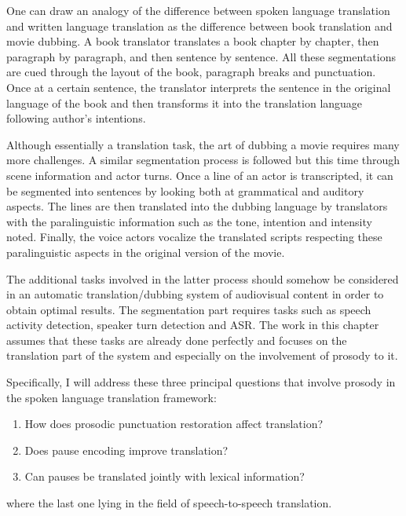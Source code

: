 One can draw an analogy of the difference between spoken language translation and written language translation as the difference between book translation and movie dubbing. A book translator translates a book chapter by chapter, then paragraph by paragraph, and then sentence by sentence. All these segmentations are cued through the layout of the book, paragraph breaks and punctuation. Once at a certain sentence, the translator interprets the sentence in the original language of the book and then transforms it into the translation language following author's intentions. 

Although essentially a translation task, the art of dubbing a movie requires many more challenges. A similar segmentation process is followed but this time through scene information and actor turns. Once a line of an actor is transcripted, it can be segmented into sentences by looking both at grammatical and auditory aspects. The lines are then translated into the dubbing language by translators with the paralinguistic information such as the tone, intention and intensity noted. Finally, the voice actors vocalize the translated scripts respecting these paralinguistic aspects in the original version of the movie. 

The additional tasks involved in the latter process should somehow be considered in an automatic translation/dubbing system of audiovisual content in order to obtain optimal results. The segmentation part requires tasks such as speech activity detection, speaker turn detection and ASR. The work in this chapter assumes that these tasks are already done perfectly and focuses on the translation part of the system and especially on the involvement of prosody to it. 

Specifically, I will address these three principal questions that involve prosody in the spoken language translation framework:

\begin{enumerate}
    \item How does prosodic punctuation restoration affect translation?
    \item Does pause encoding improve translation?
    \item Can pauses be translated jointly with lexical information?
\end{enumerate}

where the last one lying in the field of speech-to-speech translation. 

